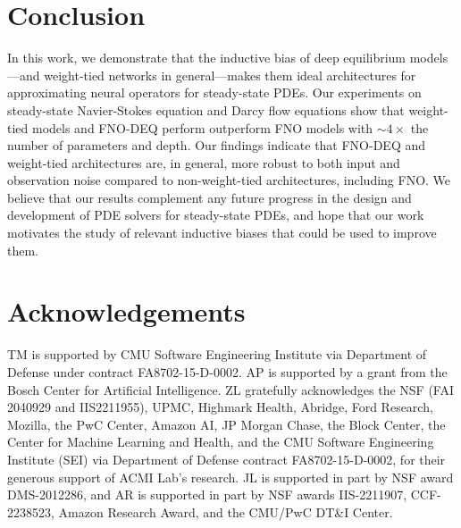 \section{Conclusion}


In this work, we demonstrate that the inductive bias of deep equilibrium models---and weight-tied networks in general---makes them ideal architectures for approximating neural operators for steady-state PDEs.
Our experiments on steady-state Navier-Stokes equation 
and Darcy flow equations show that weight-tied models and FNO-DEQ 
perform outperform FNO models with $\sim 4\times$ the number of 
parameters and depth. 
Our findings indicate that FNO-DEQ and weight-tied architectures 
are, in general, more robust to both input and observation noise compared to non-weight-tied architectures, including FNO.
We believe that our results complement any future progress in the design and development of PDE solvers \citep{tran2021factorized, li2022fourier} for steady-state PDEs,
and hope that our work motivates the study of relevant inductive biases that could be used to improve them.


\section{Acknowledgements}
TM 
is supported 
by CMU Software Engineering Institute via Department of Defense under contract FA8702-15-D-0002.
AP
is supported 
by a grant from the Bosch Center for Artificial Intelligence.
ZL gratefully acknowledges the NSF (FAI 2040929 and IIS2211955), UPMC, Highmark Health, Abridge, Ford Research, Mozilla, the PwC Center, Amazon AI, JP Morgan Chase, the Block Center, the Center for Machine Learning and Health, and the CMU Software Engineering Institute (SEI) via Department of Defense contract FA8702-15-D-0002, for their generous support of ACMI Lab’s research.
JL
is supported in part by NSF award DMS-2012286, and 
AR
is
supported in part by NSF awards IIS-2211907, CCF-2238523, Amazon Research Award, and the  CMU/PwC DT\&I Center.
